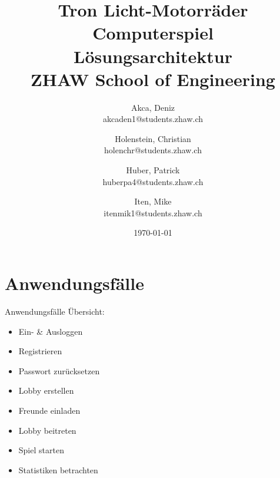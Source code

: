 \documentclass[11pt,ngerman]{article}
\begin{document}
    \title{Tron Licht-Motorräder Computerspiel\\
        \vspace{1cm}
        Lösungsarchitektur \\
        \vspace{0.5cm}
        \small{}ZHAW  School of Engineering
        \vspace{1.5cm}
    }
    \author{
        Akca, Deniz\\
        \small{akcaden1@students.zhaw.ch}
        \and
        Holenstein, Christian\\
        \small{holenchr@students.zhaw.ch}
        \and
        Huber, Patrick\\
        \small{huberpa4@students.zhaw.ch}
        \and
        Iten, Mike\\
        \small{itenmik1@students.zhaw.ch}
        \vspace{1.5cm}
    }
   \date{\today}

    \maketitle
    \newpage

    \tableofcontents
    \listoftables
    \listoffigures
    \newpage

    \section{Anwendungsfälle}
        Anwendungsfälle Übersicht:
        \begin{multicols}{2}
            \begin{itemize}
               \item Ein-  \& Ausloggen
               \item Registrieren
               \item Passwort zurücksetzen
               \item Lobby erstellen
               \item Freunde einladen
               \item Lobby beitreten
               \item Spiel starten
               \item Statistiken betrachten
           \end{itemize}
        \end{multicols}
\end{document}
